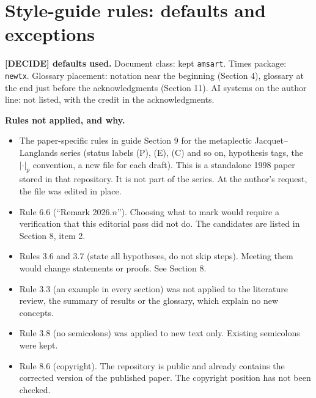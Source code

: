\documentclass[12pt,letterpaper]{amsart}
\begin{document}
\section{Style-guide rules: defaults and exceptions}

\textbf{[DECIDE] defaults used.} Document class: kept \texttt{amsart}.
Times package: \texttt{newtx}. Glossary placement: notation near the
beginning (Section 4), glossary at the end just before the acknowledgments
(Section 11). AI systems on the author line: not listed, with the credit in
the acknowledgments.

\textbf{Rules not applied, and why.}
\begin{itemize}
\item The paper-specific rules in guide Section 9 for the metaplectic
Jacquet--Langlands series (status labels (P), (E), (C) and so on, hypothesis
tags, the $|\cdot|_p$ convention, a new file for each draft). This is a
standalone 1998 paper stored in that repository. It is not part of the
series. At the author's request, the file was edited in place.
\item Rule 6.6 (``Remark 2026.$n$''). Choosing what to mark would require a
verification that this editorial pass did not do. The candidates are listed
in Section 8, item 2.
\item Rules 3.6 and 3.7 (state all hypotheses, do not skip steps). Meeting them
would change statements or proofs. See Section 8.
\item Rule 3.3 (an example in every section) was not applied to the literature
review, the summary of results or the glossary, which explain no new concepts.
\item Rule 3.8 (no semicolons) was applied to new text only. Existing
semicolons were kept.
\item Rule 8.6 (copyright). The repository is public and already contains the
corrected version of the published paper. The copyright position has not
been checked.
\end{itemize}
\end{document}
